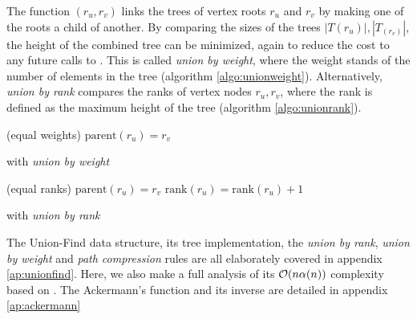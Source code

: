 The function $(r_u,r_v)$ links the trees of vertex roots $r_u$ and $r_v$ by making one of the roots a child of another. By comparing the sizes of the trees $|T(r_u)|, |T_(r_v)|$, the height of the combined tree can be minimized, again to reduce the cost to any future calls to . This is called \emph{union by weight}, where the weight stands of the number of elements in the tree (algorithm \ref{algo:unionweight}). Alternatively, \emph{union by rank} compares the ranks of vertex nodes $r_u,r_v$, where the rank is defined as the maximum height of the tree (algorithm \ref{algo:unionrank}).
\begin{algorithm}[h]
  \BlankLine
  \BlankLine
  \Else(equal weights){
    $\text{parent}(r_u)=r_v$ \;
  }
  \BlankLine
  \caption{ with \emph{union by weight}}\label{algo:unionweight}
\end{algorithm}

\begin{algorithm}[h]
  \BlankLine
  \BlankLine
  \Else(equal ranks){
    $\text{parent}(r_u)=r_v$ \;
    $\text{rank}(r_u) = \text{rank}(r_u) + 1$ \;
  }
  \BlankLine
  \caption{ with \emph{union by rank}}\label{algo:unionrank}
\end{algorithm}

The Union-Find data structure, its tree implementation, the \emph{union by rank}, \emph{union by weight} and \emph{path compression} rules are all elaborately covered in appendix \ref{ap:unionfind}. Here, we also make a full analysis of its $\mathcal{O}(n\alpha(n))$ complexity based on \cite{kozen1992design}. The Ackermann's function and its inverse are detailed in appendix \ref{ap:ackermann}

